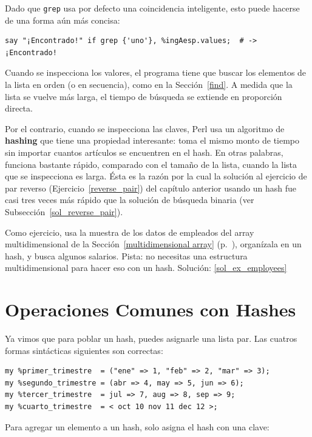 Dado que {\tt grep}  usa por defecto una coincidencia inteligente, 
esto puede hacerse de una forma aún más concisa:

\begin{verbatim}
say "¡Encontrado!" if grep {'uno'}, %ingAesp.values;  # -> ¡Encontrado!
\end{verbatim}

Cuando se inspecciona los valores, el programa tiene que buscar 
los elementos de la lista en orden (o en secuencia), como en la
Sección~\ref{find}. A medida que la lista se vuelve más larga, 
el tiempo de búsqueda se extiende en proporción directa.

Por el contrario, cuando se inspecciona las claves, Perl usa
un algoritmo de {\bf hashing} que tiene una propiedad interesante:
toma el mismo monto de tiempo sin importar cuantos artículos
se encuentren en el hash. En otras palabras, funciona bastante 
rápido, comparado con el tamaño de la lista, cuando la lista
que se inspecciona es larga. Ésta es la razón por la cual la
solución al ejercicio de par reverso (Ejercicio~\ref{reverse_pair})
del capítulo anterior usando un hash fue casi tres veces más rápido
que la solución de búsqueda binaria (ver Subsección~\ref{sol_reverse_pair}).

\label{ex_employees}
Como ejercicio, usa la muestra de los datos de empleados del 
array multidimensional  de la Sección~\ref{multidimensional array}
(p.~\pageref{multidimensional array}), organízala en un hash, y 
busca algunos salarios. Pista: no necesitas una estructura 
multidimensional para hacer eso con un hash.
Solución: \ref{sol_ex_employees}


\section{Operaciones Comunes con Hashes}

Ya vimos que para poblar un hash, puedes asignarle una lista 
par. Las cuatros formas sintácticas siguientes son correctas:

\begin{verbatim}
my %primer_trimestre  = ("ene" => 1, "feb" => 2, "mar" => 3);
my %segundo_trimestre = (abr => 4, may => 5, jun => 6);
my %tercer_trimestre  = jul => 7, aug => 8, sep => 9;
my %cuarto_trimestre  = < oct 10 nov 11 dec 12 >;
\end{verbatim}

Para agregar un elemento a un hash, solo asigna el hash con
una clave:

